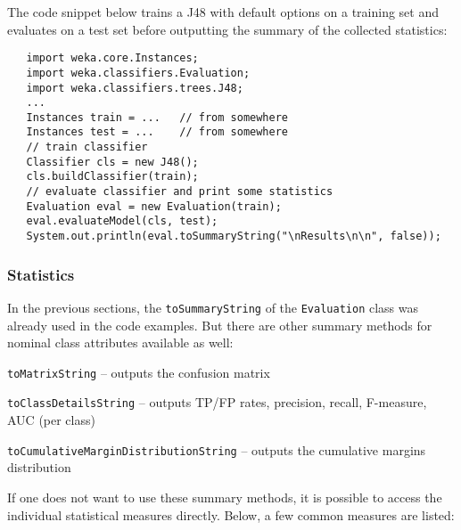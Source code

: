 The code snippet below trains a J48 with default options on a training set and
evaluates on a test set before outputting the summary of the
collected statistics:
\begin{verbatim}
   import weka.core.Instances;
   import weka.classifiers.Evaluation;
   import weka.classifiers.trees.J48;
   ...
   Instances train = ...   // from somewhere
   Instances test = ...    // from somewhere
   // train classifier
   Classifier cls = new J48();
   cls.buildClassifier(train);
   // evaluate classifier and print some statistics
   Evaluation eval = new Evaluation(train);
   eval.evaluateModel(cls, test);
   System.out.println(eval.toSummaryString("\nResults\n\n", false));
\end{verbatim}

\newpage

\subsubsection*{Statistics}
In the previous sections, the \texttt{toSummaryString} of the
\texttt{Evaluation} class was already used in the code examples. But there are
other summary methods for nominal class attributes available as well:
\begin{tight_itemize}
	\item \texttt{toMatrixString} -- outputs the confusion matrix
	\item \texttt{toClassDetailsString} -- outputs TP/FP rates, precision,
recall, F-measure, AUC (per class)
	\item \texttt{toCumulativeMarginDistributionString} -- outputs the
cumulative margins distribution
\end{tight_itemize}
If one does not want to use these summary methods, it is possible to access the
individual statistical measures directly. Below, a few common measures
are listed:
